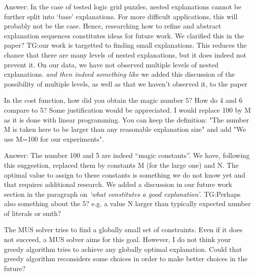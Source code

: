 \documentclass{article}
\newcommand\comment[1]{\marginpar{\tiny #1}}
\renewcommand\comment[1]{#1}
\newcommand{\tias}[1]{{\comment{\color{blue}\textsc{TG:}#1}}}
\newcommand{\emilio}[1]{{\comment{Answer: \color{red}#1}}}
\newcommand{\bart}[1]{{\comment{\color{green}#1}}}
\begin{document}
\emilio{In the case of tested logic grid puzzles, nested explanations cannot be further split into `base' explanations. For more difficult applications, this will probably not be the case. Hence, researching how to refine and abstract explanation sequences constitutes ideas for future work.} \bart{We clarified this in the paper?}
\tias{our work is targetted to finding small explanations. This reduces the chance that there are many levels of nested explanations, but it does indeed not prevent it. On our data, we have not observed multiple levels of nested explanations. \textit{and then indeed something like} we added this discussion of the possibility of multiple levels, as well as that we haven't observed it, to the paper}

\begin{quoteit}
In the cost function, how did you obtain the magic number 5? How do 4 and 6 compare to 5? Some justification would be appreciated. 
I would replace 100 by M as it is done with linear programming. You can keep the definition: "The number M is taken here to be larger than any reasonable explanation size" and add "We use M=100 for our experiments".
\end{quoteit}

\emilio{
	The number 100 and 5 are indeed ``magic constants''. We have, following this suggestion, replaced them by constants M (for the large one) and N. The optimal value to assign to these constants is something we do not know yet and that requires additional research. We added a discussion in our future work section in the paragraph on \emph{`what constitutes a good explanation'}.
} \tias{Perhaps also something about the 5? e.g. a value N larger than typically expected number of literals or smth?}

\begin{quoteit}
The MUS solver tries to find a globally small set of constraints. Even if it does not succeed, a MUS solver aims for this goal. However, I do not think your greedy algorithm tries to achieve any globally optimal explanation.
Could that greedy algorithm reconsiders some choices in order to make better choices in the future?
\end{quoteit}
\end{document}
